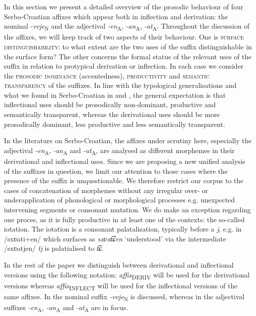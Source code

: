 \documentclass[output=paper]{langsci/langscibook}
\begin{document}
In this section we present a detailed overview of the prosodic behaviour of four Serbo-Croatian affixes which appear both in inflection and derivation: the nominal -\textit{vvje}\textsubscript{N}  and the adjectival \textit{-en}\textsubscript{A}, \textit{-an}\textsubscript{A}, \textit{-at}\textsubscript{A}. 
Throughout the discussion of the affixes, we will keep track of two aspects of their behaviour. One is \textsc{surface distinguishability}: to what extent are the two uses of the suffix distinguishable in the surface form? The other concerns the formal status of the relevant uses of the suffix in relation to protypical derivation or inflection. In each case we consider the \textsc{prosodic dominance} (accentedness), \textsc{productivity} and \textsc{semantic transparency} of the suffixes. In line with the typological generalisations and what we found in Serbo-Croatian in \citet{Arsim2013} and \citet{Sim2014}, the general expectation is that inflectional uses should be prosodically non-dominant, productive and semantically transparent, whereas the derivational uses should be more prosodically dominant, less productive and less semantically transparent.

In the literature on Serbo-Croatian, the affixes under scrutiny here, especially the adjectival \textit{-en}\textsubscript{A}, \textit{-an}\textsubscript{A} and  \textit{-at}\textsubscript{A}, are analysed as different morphemes in their derivational and inflectional uses. Since we are proposing a new unified analysis of the suffixes in question, we limit our attention to those cases where the presence of the suffix is unquestionable. We therefore restrict our corpus to the cases of concatenation of morphemes without any irregular over- or underapplication of phonological or morphological processes e.g. unexpected intervening segments or consonant mutation. We do make an exception regarding one proces, as it is fully productive in at least one of the contexts: the so-called iotation. The iotation is a consonant palatalisation, typically before a \textit{j}, e.g. in /sxʋati+en/ which surfaces as \textit{sxʋat͡ɕen} `understood' via the intermediate /sxʋatjen/ \textit{tj} is palatialised to \textit{t͡ɕ}. 

In the rest of the paper we distinguish between derivational and inflectional versions using the following notation: \textit{affix}\textsubscript{DERIV} will be used for the derivational versions whereas \textit{affix}\textsubscript{INFLECT} will be used for the inflectional versions of the same affixes.
In  the nominal suffix \textit{-vvje}\textsubscript{N} is discussed, whereas in   the adjectival suffixes \textit{{-en}}\textsubscript{A}, \textit{{-an}}\textsubscript{A} and \textit{{-at}}\textsubscript{A} are in focus.
\end{document}
